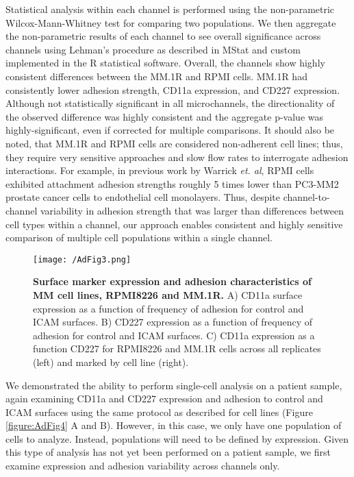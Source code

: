 Statistical analysis within each channel is performed using the non-parametric Wilcox-Mann-Whitney test for comparing two populations. We then aggregate the non-parametric results of each channel to see overall significance across channels using Lehman's procedure as described in MStat \cite{NormanR.Drinkwater, Drinkwater2011} and custom implemented in the R statistical software. Overall, the channels show highly consistent differences between the MM.1R and RPMI cells. MM.1R had consistently lower adhesion strength, CD11a expression, and CD227 expression. Although not statistically significant in all microchannels, the directionality of the observed difference was highly consistent and the aggregate p-value was highly-significant, even if corrected for multiple comparisons. It should also be noted, that MM.1R and RPMI cells are considered non-adherent cell lines; thus, they require very sensitive approaches and slow flow rates to interrogate adhesion interactions. For example, in previous work by Warrick \emph{et. al}, RPMI cells exhibited attachment adhesion strengths roughly 5 times lower than PC3-MM2 prostate cancer cells to endothelial cell monolayers. Thus, despite channel-to-channel variability in adhesion strength that was larger than differences between cell types within a channel, our approach enables consistent and highly sensitive comparison of multiple cell populations within a single channel.

\begin{figure}[ht] %
\centering
\texttt{[image: /AdFig3.png]}
\caption[\textbf{Surface marker expression and adhesion characteristics of MM cell lines, RPMI8226 and MM.1R}]{\textbf{Surface marker expression and adhesion characteristics of MM cell lines, RPMI8226 and MM.1R.} A) CD11a surface expression as a function of frequency of adhesion for control and ICAM surfaces. B) CD227 expression as a function of frequency of adhesion for control and ICAM surfaces. C) CD11a expression as a function CD227 for RPMI8226 and MM.1R cells across all replicates (left) and marked by cell line (right).}
\label{figure:AdFig3}
\end{figure}

We demonstrated the ability to perform single-cell analysis on a patient sample, again examining CD11a and CD227 expression and adhesion to control and ICAM surfaces using the same protocol as described for cell lines (Figure \ref{figure:AdFig4} A and B). However, in this case, we only have one population of cells to analyze. Instead, populations will need to be defined by expression. Given this type of analysis has not yet been performed on a patient sample, we first examine expression and adhesion variability across channels only.

